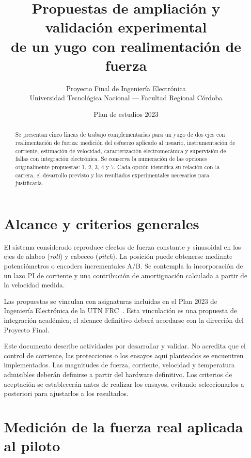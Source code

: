 \documentclass[11pt,a4paper]{article}
\title{Propuestas de ampliación y validación experimental\\
de un yugo con realimentación de fuerza}
\author{Proyecto Final de Ingeniería Electrónica\\
Universidad Tecnológica Nacional --- Facultad Regional Córdoba}
\date{Plan de estudios 2023}
\begin{document}
\maketitle

\begin{abstract}
Se presentan cinco líneas de trabajo complementarias para un yugo de dos ejes
con realimentación de fuerza: medición del esfuerzo aplicado al usuario,
instrumentación de corriente, estimación de velocidad, caracterización
electromecánica y supervisión de fallas con integración electrónica.
Se conserva la numeración de las opciones originalmente propuestas: 1, 2, 3,
4 y 7. Cada opción identifica su relación con la carrera, el desarrollo
previsto y los resultados experimentales necesarios para justificarla.
\end{abstract}

\tableofcontents
\newpage

\section*{Alcance y criterios generales}

El sistema considerado reproduce efectos de fuerza constante y sinusoidal en
los ejes de alabeo (\textit{roll}) y cabeceo (\textit{pitch}). La posición puede
obtenerse mediante potenciómetros o encoders incrementales A/B. Se contempla
la incorporación de un lazo PI de corriente y una contribución de
amortiguación calculada a partir de la velocidad medida.

Las propuestas se vinculan con asignaturas incluidas en el Plan 2023 de
Ingeniería Electrónica de la UTN FRC~\cite{plan2023}. Esta vinculación es una
propuesta de integración académica; el alcance definitivo deberá acordarse
con la dirección del Proyecto Final.

Este documento describe actividades por desarrollar y validar. No acredita
que el control de corriente, las protecciones o los ensayos aquí planteados
se encuentren implementados. Las magnitudes de fuerza, corriente, velocidad
y temperatura admisibles deberán definirse a partir del hardware definitivo.
Los criterios de aceptación se establecerán antes de realizar los ensayos,
evitando seleccionarlos a posteriori para ajustarlos a los resultados.

\section{Medición de la fuerza real aplicada al piloto}
\label{sec:fuerza}
\end{document}
